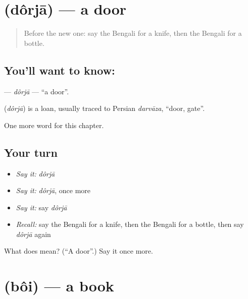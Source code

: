 \section[\texorpdfstring{\bn{দরজা} (dôrjā)}{দরজা (dôrjā)}]{ (dôrjā) — a door}

\label{lesson:BN-C63-dorja}



\begin{quote}
Before the new one: say the Bengali for a knife, then the Bengali for a bottle.
\end{quote}

\subsection*{You'll want to know: }
\textbf{} — \emph{dôrjā} — \textquotedblleft{}a door\textquotedblright{}.

\begin{cousinweb}
\textbf{} (\emph{dôrjā}) is a loan, usually traced to Persian \emph{darvāza}, \textquotedblleft{}door, gate\textquotedblright{}.
\end{cousinweb}

\begin{grammarlens}[title={What you've built}]
One more word for this chapter.
\end{grammarlens}

\subsection*{Your turn}
\begin{itemize}
\raggedright
  \item \emph{Say it:} \emph{dôrjā}
  \item \emph{Say it:} \emph{dôrjā}, once more
  \item \emph{Say it:} say \emph{dôrjā}
  \item \emph{Recall:} say the Bengali for a knife, then the Bengali for a bottle, then say \emph{dôrjā} again
\end{itemize}

\begin{tcolorbox}[breakable,colback=teal!4,colframe=teal!35!black,title={Before you move on}]
What does  mean? (\textquotedblleft{}A door\textquotedblright{}.) Say it once more.
\end{tcolorbox}
\section[\texorpdfstring{\bn{বই} (bôi)}{বই (bôi)}]{ (bôi) — a book}

